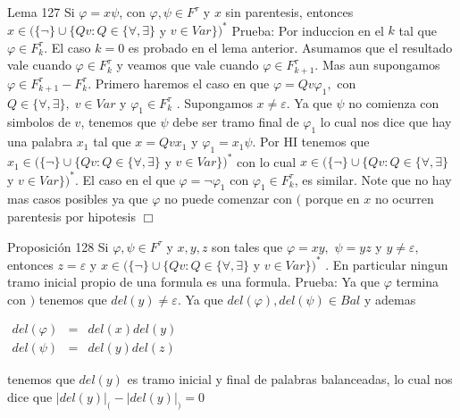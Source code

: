 Lema 127 Si \(\varphi =x\psi \), con \(\varphi ,\psi \in F^{\tau }\) y \(x\) sin parentesis, entonces \(x\in (\{\lnot \}\cup \{Qv:Q\in \{\forall ,\exists \}\) y \(v\in Var\})^{\ast }\)
Prueba: Por induccion en el \(k\) tal que \(\varphi \in F_{k}^{\tau }\). El caso \(k=0\) es probado en el lema anterior. Asumamos que el resultado vale cuando \( \varphi \in F_{k}^{\tau }\) y veamos que vale cuando \(\varphi \in F_{k+1}^{\tau }\). Mas aun supongamos \(\varphi \in F_{k+1}^{\tau }-F_{k}^{\tau }\). Primero haremos el caso en que \(\varphi =Qv\varphi _{1},\) con \(Q\in \{\forall ,\exists \},\;v\in Var\) y \(\varphi _{1}\in F_{k}^{\tau }\) . Supongamos \(x\neq \varepsilon \). Ya que \(\psi \) no comienza con simbolos de \(v\), tenemos que \(\psi \) debe ser tramo final de \(\varphi _{1}\) lo cual nos dice que hay una palabra \(x_{1}\) tal que \(x=Qvx_{1}\) y \(\varphi _{1}=x_{1}\psi \). Por HI tenemos que \(x_{1}\in (\{\lnot \}\cup \{Qv:Q\in \{\forall ,\exists \}\) y \(v\in Var\})^{\ast }\) con lo cual \(x\in (\{\lnot \}\cup \{Qv:Q\in \{\forall ,\exists \}\) y \(v\in Var\})^{\ast }\). El caso en el que \(\varphi =\lnot \varphi _{1}\) con \(\varphi _{1}\in F_{k}^{\tau }\), es similar. Note que no hay mas casos posibles ya que \(\varphi \) no puede comenzar con \((\) porque en \(x\) no ocurren parentesis por hipotesis \(\Box\)

Proposición 128 Si \(\varphi ,\psi \in F^{\tau }\) y \( x,y,z\) son tales que \(\varphi =xy,\) \(\psi =yz\) y \(y\neq \varepsilon ,\) entonces \(z=\varepsilon \) y \( x\in (\{\lnot \}\cup \{Qv:Q\in \{\forall ,\exists \}\) y \(v\in Var\})^{\ast }\) . En particular ningun tramo inicial propio de una formula es una formula.
Prueba: Ya que \(\varphi \) termina con \()\) tenemos que \(del(y)\neq \varepsilon .\) Ya que \(del(\varphi ),del(\psi )\in Bal\) y ademas

\(\displaystyle \begin{array}{rcl} del(\varphi ) & =& del(x)del(y) \\ del(\psi ) & =& del(y)del(z) \end{array} \)

tenemos que \(del(y)\) es tramo inicial y final de palabras balanceadas, lo cual nos dice que
\(\displaystyle \left\vert del(y)\right\vert _{(}-\left\vert del(y)\right\vert _{)}=0 \)

